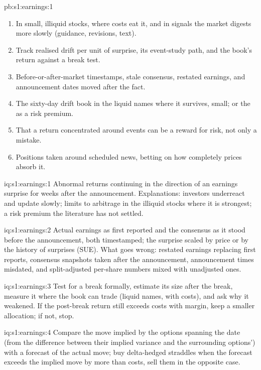\begin{solution}{pb:s1:earnings:1}
\begin{enumerate}
\item In small, illiquid stocks, where costs eat it, and in signals the market digests more slowly (guidance, revisions, text).
\item Track realised drift per unit of surprise, its event-study path, and the book's return against a break test.
\item Before-or-after-market timestamps, stale consensus, restated earnings, and announcement dates moved after the fact.
\item The sixty-day drift book in the liquid names where it survives, small; or the  as a risk premium.
\item That a return concentrated around events can be a reward for risk, not only a mistake.
\item Positions taken around scheduled news, betting on how completely prices absorb it.
\end{enumerate}
\end{solution}

\begin{solution}{iq:s1:earnings:1}
Abnormal returns continuing in the direction of an earnings surprise for weeks after the announcement. Explanations: investors underreact and update slowly;
limits to arbitrage in the illiquid stocks where it is strongest; a risk premium the literature has not settled.
\end{solution}

\begin{solution}{iq:s1:earnings:2}
Actual earnings as first reported and the consensus as it stood before the announcement, both timestamped; the surprise scaled by price or by the history
of surprises (SUE). What goes wrong: restated earnings replacing first reports, consensus snapshots taken after the announcement, announcement times
misdated, and split-adjusted per-share numbers mixed with unadjusted ones.
\end{solution}

\begin{solution}{iq:s1:earnings:3}
Test for a break formally, estimate its size after the break, measure it where the book can trade (liquid names, with costs), and ask why it weakened. If
the post-break return still exceeds costs with margin, keep a smaller allocation; if not, stop.
\end{solution}

\begin{solution}{iq:s1:earnings:4}
Compare the move implied by the options spanning the date (from the difference between their implied variance and the surrounding options') with a
forecast of the actual move; buy delta-hedged straddles when the forecast exceeds the implied move by more than costs, sell them in the opposite case.
\end{solution}

